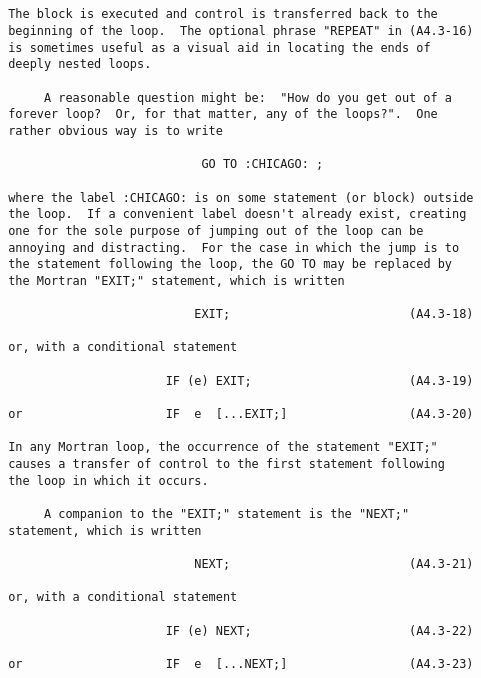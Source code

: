 \newpage \begin{verbatim}
 
 
 The block is executed and control is transferred back to the
 beginning of the loop.  The optional phrase "REPEAT" in (A4.3-16)
 is sometimes useful as a visual aid in locating the ends of
 deeply nested loops.
 
      A reasonable question might be:  "How do you get out of a
 forever loop?  Or, for that matter, any of the loops?".  One
 rather obvious way is to write
 
                            GO TO :CHICAGO: ;
 
 where the label :CHICAGO: is on some statement (or block) outside
 the loop.  If a convenient label doesn't already exist, creating
 one for the sole purpose of jumping out of the loop can be
 annoying and distracting.  For the case in which the jump is to
 the statement following the loop, the GO TO may be replaced by
 the Mortran "EXIT;" statement, which is written
 
                           EXIT;                         (A4.3-18)
 
 or, with a conditional statement
 
                       IF (e) EXIT;                      (A4.3-19)
 
 or                    IF  e  [...EXIT;]                 (A4.3-20)
 
 In any Mortran loop, the occurrence of the statement "EXIT;"
 causes a transfer of control to the first statement following
 the loop in which it occurs.
 
      A companion to the "EXIT;" statement is the "NEXT;"
 statement, which is written
 
                           NEXT;                         (A4.3-21)
 
 or, with a conditional statement
 
                       IF (e) NEXT;                      (A4.3-22)
 
 or                    IF  e  [...NEXT;]                 (A4.3-23)
\end{verbatim} 
